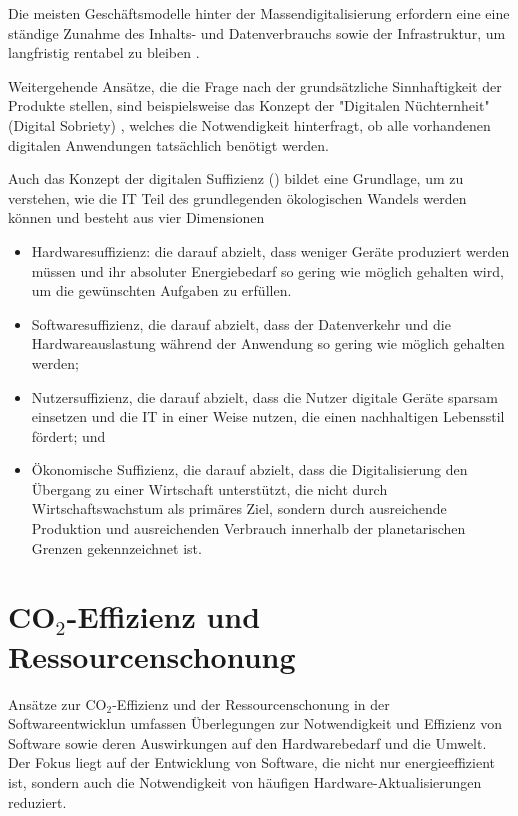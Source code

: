 \documentclass{article}
\begin{document}
Die meisten Geschäftsmodelle hinter der Massendigitalisierung erfordern eine
eine ständige Zunahme des Inhalts- und Datenverbrauchs sowie der
Infrastruktur, um langfristig rentabel zu bleiben \cite{brouillard_deploying_2021}. 

 Weitergehende  Ansätze, die die Frage nach der grundsätzliche Sinnhaftigkeit der Produkte stellen, sind beispielsweise das Konzept der "Digitalen Nüchternheit" (Digital Sobriety) \cite{project_shift_2019,brouillard_deploying_2021}, welches die Notwendigkeit hinterfragt, ob alle vorhandenen digitalen Anwendungen tatsächlich benötigt werden. 

Auch das Konzept der digitalen Suffizienz (\cite{santarius_digital_2023}) bildet eine Grundlage, um zu verstehen, wie die IT Teil des grundlegenden ökologischen Wandels werden können und besteht aus vier Dimensionen 
\begin{itemize}
	\item Hardwaresuffizienz: die darauf abzielt, dass weniger Geräte produziert werden müssen und ihr absoluter Energiebedarf so gering wie möglich gehalten wird, um die gewünschten Aufgaben zu erfüllen.
  \item  Softwaresuffizienz, die darauf abzielt, dass der Datenverkehr und die Hardwareauslastung während der Anwendung so gering wie möglich gehalten werden; 
 \item Nutzersuffizienz, die darauf abzielt, dass die Nutzer digitale Geräte sparsam einsetzen und die IT in einer Weise nutzen, die einen nachhaltigen Lebensstil fördert; und 
\item Ökonomische Suffizienz, die darauf abzielt, dass die Digitalisierung den Übergang zu einer Wirtschaft unterstützt, die nicht durch Wirtschaftswachstum als primäres Ziel, sondern durch ausreichende Produktion und ausreichenden Verbrauch innerhalb der planetarischen Grenzen gekennzeichnet ist. 
\end{itemize}




\section{CO$_2$-Effizienz und Ressourcenschonung}

Ansätze zur CO$_2$-Effizienz und der Ressourcenschonung in der Softwareentwicklun umfassen Überlegungen zur Notwendigkeit und Effizienz von Software sowie deren Auswirkungen auf den Hardwarebedarf und die Umwelt. Der Fokus liegt auf der Entwicklung von Software, die nicht nur energieeffizient ist, sondern auch die Notwendigkeit von häufigen Hardware-Aktualisierungen reduziert.
\end{document}
